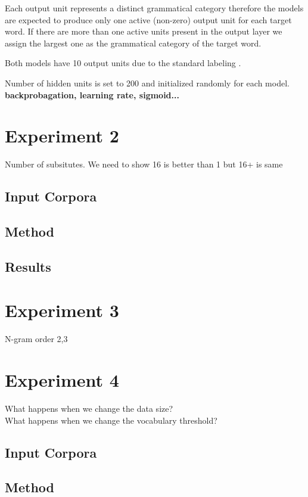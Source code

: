 Each output unit represents a distinct grammatical category therefore
the models are expected to produce only one active (non-zero) output
unit for each target word.  If there are more than one active units
present in the output layer we assign the largest one as the
grammatical category of the target word.

Both models have 10 output units due to the standard labeling
\citep*{Mintz200391}.

Number of hidden units is set to 200 and initialized randomly for each
model. {\bf backprobagation, learning rate, sigmoid...}




\section{Experiment 2}
Number of subsitutes.  We need to show 16 is better than 1 but 16+ is same
\subsection{Input Corpora}
\subsection{Method}
\subsection{Results}

\section{Experiment 3}
N-gram order 2,3

\section{Experiment 4}
What happens when we change the data size?\\
What happens when we change the vocabulary threshold?\\

\subsection{Input Corpora}
\subsection{Method}

